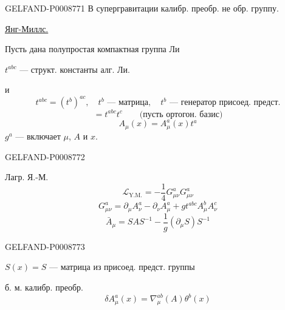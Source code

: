\begin{GelfandAdjacentEvidence}{GELFAND-P000877}{1}
В супергравитации калибр. преобр. не обр. группу.

\uline{Янг-Миллс.}

Пусть дана полупростая компактная группа Ли

$t^{abc}$ --- структ. константы алг. Ли.

и
\begin{equation*}
t^{abc}=(t^b)^{ac},\quad t^b\text{ --- матрица},\quad t^b\text{ --- генератор присоед. предст.}
\tag{52}
\end{equation*}
\begin{equation*}
[t^a,t^b]=t^{abc}t^c\qquad\text{(пусть ортогон. базис)}
\tag{53}
\end{equation*}
\begin{equation*}
A_\mu(x)=A_\mu^a(x)t^a
\tag{54}
\end{equation*}
$g^a$ --- включает $\mu$, $A$ и $x$.

\end{GelfandAdjacentEvidence}
\begin{GelfandAdjacentEvidence}{GELFAND-P000877}{2}


Лагр. Я.-М.
\begin{equation*}
\mathcal L_{\mathrm{Y.M.}}=-\frac14G_{\mu\nu}^aG_{\mu\nu}^a
\tag{55}
\end{equation*}
\begin{equation*}
G_{\mu\nu}^a=\partial_\mu A_\nu^a-\partial_\nu A_\mu^a+g t^{abc}A_\mu^b A_\nu^c
\tag{56}
\end{equation*}
\begin{equation*}
\bar A_\mu=SAS^{-1}-\frac1g(\partial_\mu S)S^{-1}
\tag{57}
\end{equation*}
\end{GelfandAdjacentEvidence}
\begin{GelfandAdjacentEvidence}{GELFAND-P000877}{3}


$S(x)=S$ --- матрица из присоед. предст. группы

б. м. калибр. преобр.
\begin{equation*}
\delta A_\mu^a(x)=\nabla_\mu^{ab}(A)\theta^b(x)
\tag{58}
\end{equation*}
\end{GelfandAdjacentEvidence}

